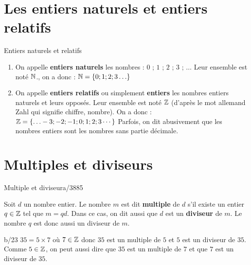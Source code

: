 \newpage

\begin{pageCours}


\section{Les entiers naturels et entiers relatifs}

\begin{DefLTQ}{Entiers naturels et relatifs}{}

\begin{enumerate}
\item On appelle \textbf{entiers naturels} les nombres : $0$ ; $1$ ; $2$ ; $3$ ; $\ldots$  Leur ensemble est noté $\mathbb N$., on a donc : $\mathbb N =  \lbrace 0 ; 1 ; 2 ; 3 \ldots \rbrace $
 
\item  On appelle \textbf{entiers relatifs} ou simplement \textbf{entiers} les nombres entiers naturels et leurs opposés. Leur ensemble est noté $\mathbb Z$ (d'après le mot allemand Zahl qui signifie chiffre, nombre).
On a donc : $\mathbb Z = \lbrace \ldots -3 ; -2 ; -1 ; 0 ; 1 ; 2 ; 3  \cdots  \rbrace$
Parfois, on dit abusivement que les nombres entiers sont les nombres sans partie décimale.
\end{enumerate}
\end{DefLTQ}

 
\section{Multiples et diviseurs}

\begin{minipage}{0.5\linewidth}

\begin{DefTQ}{Multiple et diviseur}{a/3885}

  Soit $d$ un nombre entier. Le nombre $m$ est dit \textbf{multiple} de $d$ s'il existe un entier $q \in \mathbb Z$ tel que $m=qd$. Dans ce cas, on dit aussi
  que $d$ est un \textbf{diviseur} de $m$. Le nombre $q$ est donc aussi un diviseur de $m$.
\end{DefTQ}
\end{minipage}
\begin{minipage}{0.5\linewidth}
\begin{ExTQ}{}{b/23} 
  $35=5 \times 7$ où $7 \in \mathbb Z$ donc $35$ est un multiple de $5$
  et $5$ est un diviseur de $35$. Comme $5 \in \mathbb Z$, on peut aussi
  dire que $35$ est un multiple de $7$ et que $7$ est un diviseur de
  $35$.
  

\end{ExTQ}
\end{minipage}
\end{pageCours}
